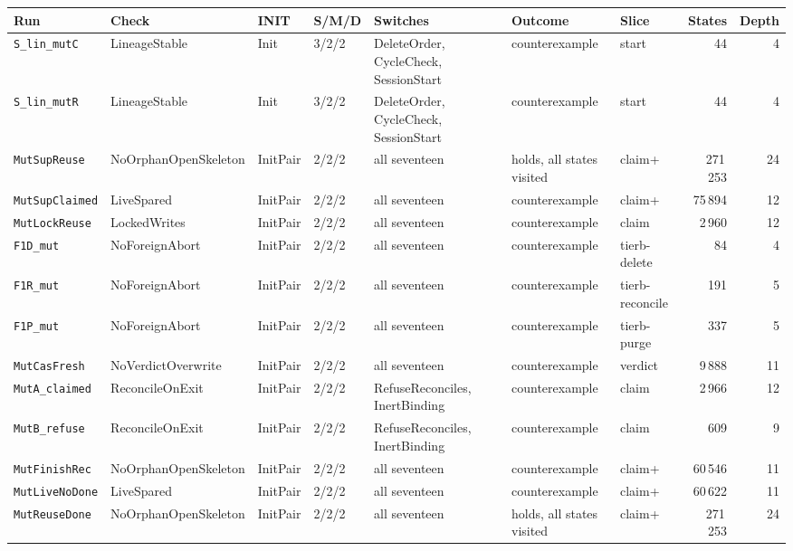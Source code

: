 \documentclass[a4paper,10pt,fleqn]{article}
\begin{document}
{\scriptsize
\begin{center}
\begin{tabularx}{\textwidth}{@{}l l l l X X l r r@{}}
\toprule
\textbf{Run} & \textbf{Check} & \textbf{INIT} & \textbf{S/M/D} & \textbf{Switches} & \textbf{Outcome} & \textbf{Slice} & \textbf{States} & \textbf{Depth} \\
\midrule
\texttt{S\_lin\_mutC} & LineageStable & Init & 3/2/2 & DeleteOrder, CycleCheck, SessionStart & counterexample & start & 44 & 4 \\
\texttt{S\_lin\_mutR} & LineageStable & Init & 3/2/2 & DeleteOrder, CycleCheck, SessionStart & counterexample & start & 44 & 4 \\
\texttt{MutSupReuse} & NoOrphanOpenSkeleton & InitPair & 2/2/2 & all seventeen & holds, all states visited & claim+ & 271\,253 & 24 \\
\texttt{MutSupClaimed} & LiveSpared & InitPair & 2/2/2 & all seventeen & counterexample & claim+ & 75\,894 & 12 \\
\texttt{MutLockReuse} & LockedWrites & InitPair & 2/2/2 & all seventeen & counterexample & claim & 2\,960 & 12 \\
\texttt{F1D\_mut} & NoForeignAbort & InitPair & 2/2/2 & all seventeen & counterexample & tierb-delete & 84 & 4 \\
\texttt{F1R\_mut} & NoForeignAbort & InitPair & 2/2/2 & all seventeen & counterexample & tierb-reconcile & 191 & 5 \\
\texttt{F1P\_mut} & NoForeignAbort & InitPair & 2/2/2 & all seventeen & counterexample & tierb-purge & 337 & 5 \\
\texttt{MutCasFresh} & NoVerdictOverwrite & InitPair & 2/2/2 & all seventeen & counterexample & verdict & 9\,888 & 11 \\
\texttt{MutA\_claimed} & ReconcileOnExit & InitPair & 2/2/2 & RefuseReconciles, InertBinding & counterexample & claim & 2\,966 & 12 \\
\texttt{MutB\_refuse} & ReconcileOnExit & InitPair & 2/2/2 & RefuseReconciles, InertBinding & counterexample & claim & 609 & 9 \\
\texttt{MutFinishRec} & NoOrphanOpenSkeleton & InitPair & 2/2/2 & all seventeen & counterexample & claim+ & 60\,546 & 11 \\
\texttt{MutLiveNoDone} & LiveSpared & InitPair & 2/2/2 & all seventeen & counterexample & claim+ & 60\,622 & 11 \\
\texttt{MutReuseDone} & NoOrphanOpenSkeleton & InitPair & 2/2/2 & all seventeen & holds, all states visited & claim+ & 271\,253 & 24 \\

\end{tabularx}
\end{center}}
\end{document}
